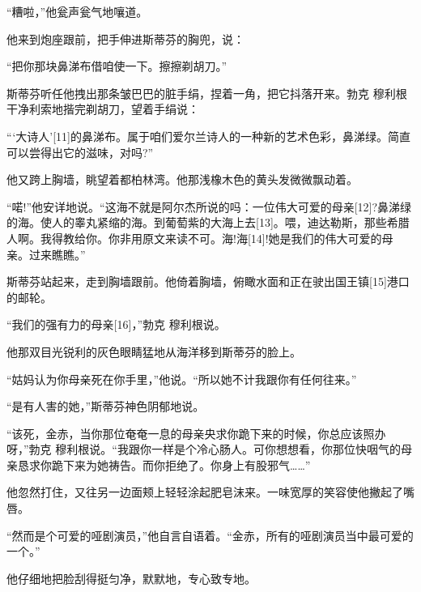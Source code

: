\documentclass{article}
\begin{document}
“糟啦，”他瓮声瓮气地嚷道。



他来到炮座跟前，把手伸进斯蒂芬的胸兜，说：



“把你那块鼻涕布借咱使一下。擦擦剃胡刀。”



斯蒂芬听任他拽出那条皱巴巴的脏手绢，捏着一角，把它抖落开来。勃克 \cdot 穆利根干净利索地揩完剃胡刀，望着手绢说：



“‘大诗人’[11]的鼻涕布。属于咱们爱尔兰诗人的一种新的艺术色彩，鼻涕绿。简直可以尝得出它的滋味，对吗?”



他又跨上胸墙，眺望着都柏林湾。他那浅橡木色的黄头发微微飘动着。



“喏!”他安详地说。“这海不就是阿尔杰所说的吗：一位伟大可爱的母亲[12]?鼻涕绿的海。使人的睾丸紧缩的海。到葡萄紫的大海上去[13]。喂，迪达勒斯，那些希腊人啊。我得教给你。你非用原文来读不可。海!海[14]!她是我们的伟大可爱的母亲。过来瞧瞧。”



斯蒂芬站起来，走到胸墙跟前。他倚着胸墙，俯瞰水面和正在驶出国王镇[15]港口的邮轮。



“我们的强有力的母亲[16]，”勃克 \cdot 穆利根说。



他那双目光锐利的灰色眼睛猛地从海洋移到斯蒂芬的脸上。



“姑妈认为你母亲死在你手里，”他说。“所以她不计我跟你有任何往来。”



“是有人害的她，”斯蒂芬神色阴郁地说。



“该死，金赤，当你那位奄奄一息的母亲央求你跪下来的时候，你总应该照办呀，”勃克 \cdot 穆利根说。“我跟你一样是个冷心肠人。可你想想看，你那位快咽气的母亲恳求你跪下来为她祷告。而你拒绝了。你身上有股邪气……”



他忽然打住，又往另一边面颊上轻轻涂起肥皂沫来。一味宽厚的笑容使他撇起了嘴唇。



“然而是个可爱的哑剧演员，”他自言自语着。“金赤，所有的哑剧演员当中最可爱的一个。”



他仔细地把脸刮得挺匀净，默默地，专心致专地。
\end{document}
